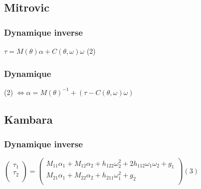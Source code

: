 \documentclass[pdftex,a4paper,11pt]{article}
\begin{document}

\subsection{Mitrovic}

\subsubsection{Dynamique inverse}
$\tau = M(\theta)\alpha + C(\theta, \omega) \omega $ (2)

\subsubsection{Dynamique}
(2) $\Leftrightarrow \alpha = M(\theta)^{-1} + (\tau - C(\theta, \omega) \omega) $


\subsection{Kambara}

\subsubsection{Dynamique inverse}
$
\begin{pmatrix}
    \tau_1 \\
    \tau_2 \\
\end{pmatrix}
=
\begin{pmatrix}
    M_{11}\alpha_1 + M_{12}\alpha_2 + h_{122}\omega_2^2 + 2h_{112}\omega_1\omega_2 + g_1 \\
    M_{21}\alpha_1 + M_{22}\alpha_2 + h_{211}\omega_1^2 + g_2 \\
\end{pmatrix}
(3)$
\end{document}
